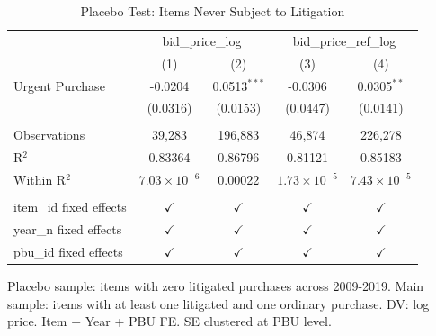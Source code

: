 \begin{table}[ht]
  \centering
  \caption{Placebo Test: Items Never Subject to Litigation}
  \label{tab:placebo}
  \small

\begingroup
\centering
\begin{tabular}{lcccc}
   \toprule
    & \multicolumn{2}{c}{bid\_price\_log} & \multicolumn{2}{c}{bid\_price\_ref\_log}\\
                           & (1)                   & (2)            & (3)                   & (4)\\  
   \midrule 
   Urgent Purchase         & -0.0204               & 0.0513$^{***}$ & -0.0306               & 0.0305$^{**}$\\   
                           & (0.0316)              & (0.0153)       & (0.0447)              & (0.0141)\\   
    \\
   Observations            & 39,283                & 196,883        & 46,874                & 226,278\\  
   R$^2$                   & 0.83364               & 0.86796        & 0.81121               & 0.85183\\  
   Within R$^2$            & $7.03\times 10^{-6}$  & 0.00022        & $1.73\times 10^{-5}$  & $7.43\times 10^{-5}$\\   
    \\
   item\_id fixed effects  & $\checkmark$          & $\checkmark$   & $\checkmark$          & $\checkmark$\\   
   year\_n fixed effects   & $\checkmark$          & $\checkmark$   & $\checkmark$          & $\checkmark$\\   
   pbu\_id fixed effects   & $\checkmark$          & $\checkmark$   & $\checkmark$          & $\checkmark$\\   
   \bottomrule
\end{tabular}
 
\par \raggedright 
Placebo sample: items with zero litigated purchases across 2009-2019. Main sample: items with at least one litigated and one ordinary purchase. DV: log price. Item + Year + PBU FE. SE clustered at PBU level.
\par\endgroup


\end{table}
